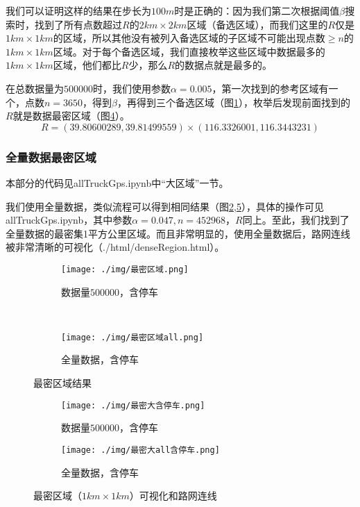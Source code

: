 \documentclass[UTF8]{ctexart}
\begin{document}
我们可以证明这样的结果在步长为$100m$时是正确的：因为我们第二次根据阈值$\beta$搜索时，找到了所有点数超过$R$的$2km\times 2km$区域（备选区域），而我们这里的$R$仅是$1km\times 1km$的区域，所以其他没有被列入备选区域的子区域不可能出现点数$\ge n$的$1km\times 1km$区域。对于每个备选区域，我们直接枚举这些区域中数据最多的$1km\times 1km$区域，他们都比$R$少，那么$R$的数据点就是最多的。

在总数据量为$500000$时，我们使用参数$\alpha=0.005$，第一次找到的参考区域有一个，点数$n = 3650$，得到$\beta$，再得到三个备选区域（图\ref{denseResult}），枚举后发现前面找到的$R$就是数据最密区域（图\ref{denseLarge}）。$$ R = (39.80600289, 39.81499559) \times (116.3326001, 116.3443231) $$

\subsubsection{全量数据最密区域}

本部分的代码见allTruckGps.ipynb中“大区域”一节。

我们使用全量数据，类似流程可以得到相同结果（图\ref{denseResultAll},\ref{denseLargeAll}），具体的操作可见allTruckGps.ipynb，其中参数$\alpha=0.047, n = 452968$，$R$同上。至此，我们找到了全量数据的最密集1平方公里区域。而且非常明显的，使用全量数据后，路网连线被非常清晰的可视化（./html/denseRegion.html）。

\begin{figure}[!htb]
    \centering
    \begin{subfigure}[b]{0.7\textwidth}
        \texttt{[image: ./img/最密区域.png]}
        \caption{数据量$500000$，含停车}
        \label{denseResult}
    \end{subfigure}
    \\
    \begin{subfigure}[b]{0.7\textwidth}
        \texttt{[image: ./img/最密区域all.png]}
        \caption{全量数据，含停车}
        \label{denseResultAll}
    \end{subfigure}
    \caption{最密区域结果}
    \label{denseR}
\end{figure}

\begin{figure}[!htb]
    \centering
    \begin{subfigure}[b]{0.49\textwidth}
        \texttt{[image: ./img/最密大含停车.png]}
        \caption{数据量$500000$，含停车}
        \label{denseLarge}
    \end{subfigure}
    \hfill
    \begin{subfigure}[b]{0.49\textwidth}
        \texttt{[image: ./img/最密大all含停车.png]}
        \caption{全量数据，含停车}
        \label{denseLargeAll}
    \end{subfigure}
    \caption{最密区域（$1km\times 1km$）可视化和路网连线}
    \label{denseL}
\end{figure}
\end{document}
